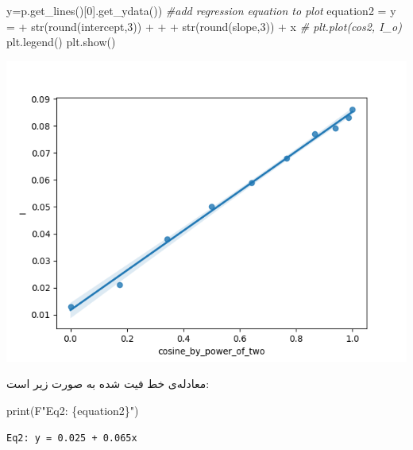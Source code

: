 \documentclass{article}
\newenvironment{Shaded}{}{}
\newcommand{\BuiltInTok}[1]{#1}
\newcommand{\CommentTok}[1]{\textcolor[rgb]{0.38,0.63,0.69}{\textit{#1}}}
\newcommand{\DecValTok}[1]{\textcolor[rgb]{0.25,0.63,0.44}{#1}}
\newcommand{\NormalTok}[1]{#1}
\newcommand{\OperatorTok}[1]{\textcolor[rgb]{0.40,0.40,0.40}{#1}}
\newcommand{\SpecialCharTok}[1]{\textcolor[rgb]{0.25,0.44,0.63}{#1}}
\newcommand{\SpecialStringTok}[1]{\textcolor[rgb]{0.73,0.40,0.53}{#1}}
\newcommand{\StringTok}[1]{\textcolor[rgb]{0.25,0.44,0.63}{#1}}
\begin{document}
\begin{latin}
\begin{Shaded}
\begin{Highlighting}[]
\NormalTok{                                                       y}\OperatorTok{=}\NormalTok{p.get\_lines()[}\DecValTok{0}\NormalTok{].get\_ydata())}
\CommentTok{\#add regression equation to plot}
\NormalTok{equation2 }\OperatorTok{=} \StringTok{\textquotesingle{}y = \textquotesingle{}} \OperatorTok{+} \BuiltInTok{str}\NormalTok{(}\BuiltInTok{round}\NormalTok{(intercept,}\DecValTok{3}\NormalTok{)) }\OperatorTok{+} \StringTok{\textquotesingle{} + \textquotesingle{}} \OperatorTok{+} \BuiltInTok{str}\NormalTok{(}\BuiltInTok{round}\NormalTok{(slope,}\DecValTok{3}\NormalTok{)) }\OperatorTok{+} \StringTok{\textquotesingle{}x\textquotesingle{}}
\CommentTok{\# plt.plot(cos2, I\_o)}
\NormalTok{plt.legend()}
\NormalTok{plt.show()}
\end{Highlighting}
\end{Shaded}
\begin{center}
\includegraphics[scale=0.80]{I-cos^2(theta) fig.png}
\end{center}
\end{latin}
معادله‌ی خط فیت شده به صورت زیر است:
\begin{latin}
\begin{Highlighting}
\BuiltInTok{print}\NormalTok{(}\SpecialStringTok{F"Eq2: }\SpecialCharTok{\{}\NormalTok{equation2}\SpecialCharTok{\}}\SpecialStringTok{"}\NormalTok{)}
\end{Highlighting}
\begin{verbatim}
Eq2: y = 0.025 + 0.065x
\end{verbatim}	
\end{latin}
\end{document}
